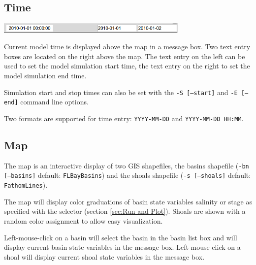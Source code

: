 \subsection{Time}
\label{sec:Time}
\includegraphics[width=0.7\textwidth]{graphics/TimeControl.png}

Current model time is displayed above the map in a message box. Two text entry boxes are located on the right above the map.  The text entry on the left can be used to set the model simulation start time, the text entry on the right to set the model simulation end time.

Simulation start and stop times can also be set with the \texttt{-S [--start]} and \texttt{-E [--end]} command line options.

Two formats are supported for time entry: \texttt{YYYY-MM-DD} and \texttt{YYYY-MM-DD HH:MM}.

\subsection{Map}
\label{sec:Map}
The map is an interactive display of two GIS shapefiles, the basins shapefile (\texttt{-bn [--basins]} default: \texttt{FLBayBasins}) and the shoals shapefile (\texttt{-s [--shoals]} default: \texttt{FathomLines}).

The map will display color graduations of basin state variables salinity or stage as specified with the selector (section \ref{sec:Run and Plot}). Shoals are shown with a random color assignment to allow easy visualization. 

Left-mouse-click on a basin will select the basin in the basin list box and will display current basin state variables in the message box.  Left-mouse-click on a shoal will display current shoal state variables in the message box. 

